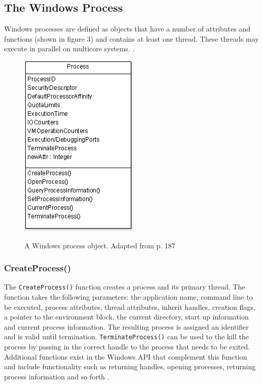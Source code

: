 \documentclass[12pt,a4paper,oneside]{article}
\def\code#1{\texttt{#1}}
\begin{document}
\begin{spacing}{1.4}
\subsection{The Windows Process}
Windows processes are defined as objects that have a number of attributes and functions (shown in figure 3) and contains at least one thread. These threads may execute in parallel on multicore systems. \citep{OSInternals&DesignPrinciplesStallings}.

\begin{figure}[H]
\includegraphics{procObj}
\label{fig:procObj}
\caption{A Windows process object. Adapted from \cite{OSInternals&DesignPrinciplesStallings} p. 187} 
\end{figure}

\subsubsection{CreateProcess()}
The \code{CreateProcess()} function creates a process and its primary thread. The function takes the following parameters: the application name, command line to be executed, process attributes, thread attributes, inherit handles, creation flags, a pointer to the environment block, the current directory, start up information and current process information. The resulting process is assigned an identifier and is valid until termination. \code{TerminateProcess()} can be used to the kill the process by passing in the correct handle to the process that needs to be exited. Additional functions exist in the Windows API that complement this function and include functionality such as returning handles, opening processes, returning process information and so forth \citep{MSDN_API}.


\end{spacing}
\end{document}
